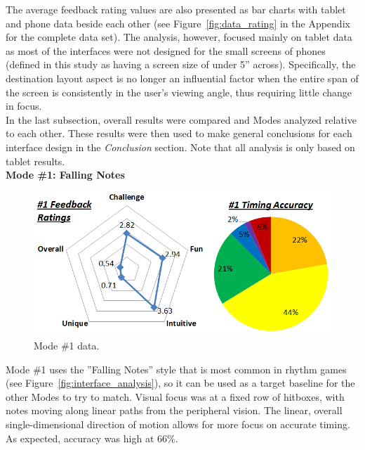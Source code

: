 \documentclass{sig-alternate}
\begin{document}
The average feedback rating values are also presented as bar charts with tablet and phone data beside each other (see Figure~\ref{fig:data_rating} in the Appendix for the complete data set). The analysis, however, focused mainly on tablet data as most of the interfaces were not designed for the small screens of phones (defined in this study as having a screen size of under 5'' across). Specifically, the destination layout aspect is no longer an influential factor when the entire span of the screen is consistently in the user's viewing angle, thus requiring little change in focus. \\

In the last subsection, overall results were compared and Modes analyzed relative to each other. These results were then used to make general conclusions for each interface design in the \textit{Conclusion} section. Note that all analysis is only based on tablet results. \\

\newpage
\noindent \textbf{Mode \#1: Falling Notes}

\begin{figure}[htb!]
	\begin{center}
		\includegraphics[width=1\linewidth]{figure_chart_1}
	\end{center}
	\vspace{-12pt}
	\caption{Mode \#1 data.}
	\label{fig:chart_1}
\end{figure}

Mode \#1 uses the ''Falling Notes'' style that is most common in rhythm games (see Figure~\ref{fig:interface_analysis}), so it can be used as a target baseline for the other Modes to try to match. Visual focus was at a fixed row of hitboxes, with notes moving along linear paths from the peripheral vision. The linear, overall single-dimensional direction of motion allows for more focus on accurate timing. As expected, accuracy was high at 66\%. \\
\end{document}
